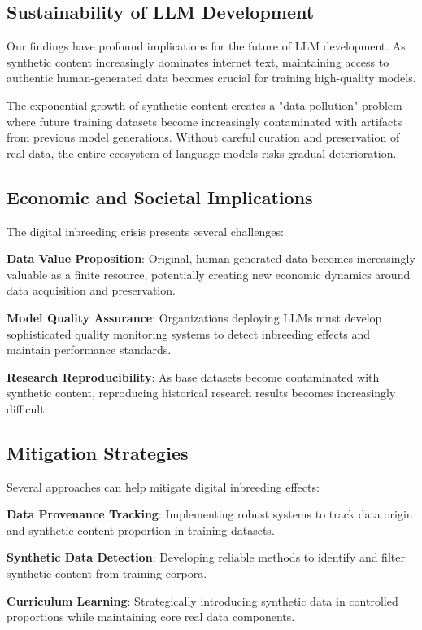 \documentclass{article}
\begin{document}
\subsection{Sustainability of LLM Development}

Our findings have profound implications for the future of LLM development. As synthetic content increasingly dominates internet text, maintaining access to authentic human-generated data becomes crucial for training high-quality models.

The exponential growth of synthetic content creates a "data pollution" problem where future training datasets become increasingly contaminated with artifacts from previous model generations. Without careful curation and preservation of real data, the entire ecosystem of language models risks gradual deterioration.

\subsection{Economic and Societal Implications}

The digital inbreeding crisis presents several challenges:

\textbf{Data Value Proposition}: Original, human-generated data becomes increasingly valuable as a finite resource, potentially creating new economic dynamics around data acquisition and preservation.

\textbf{Model Quality Assurance}: Organizations deploying LLMs must develop sophisticated quality monitoring systems to detect inbreeding effects and maintain performance standards.

\textbf{Research Reproducibility}: As base datasets become contaminated with synthetic content, reproducing historical research results becomes increasingly difficult.

\subsection{Mitigation Strategies}

Several approaches can help mitigate digital inbreeding effects:

\textbf{Data Provenance Tracking}: Implementing robust systems to track data origin and synthetic content proportion in training datasets.

\textbf{Synthetic Data Detection}: Developing reliable methods to identify and filter synthetic content from training corpora.

\textbf{Curriculum Learning}: Strategically introducing synthetic data in controlled proportions while maintaining core real data components.
\end{document}
